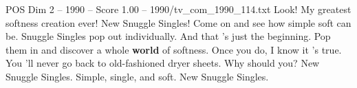 \begin{textsample}{POS Dim 2 – 1990 – Score 1.00 – 1990/tv\_com\_1990\_114.txt}  \label{ex:f2_pos_036}
Look!
My greatest softness creation ever!
New Snuggle Singles!
Come on and see how simple soft can be.
Snuggle Singles pop out individually.
And that 's just the beginning.
Pop them in and discover a whole \textbf{world} of softness.
Once you do, I know it 's true.
You 'll never go back to old-fashioned dryer sheets.
Why should you?
New Snuggle Singles.
Simple, single, and soft.
New Snuggle Singles.

\end{textsample}
